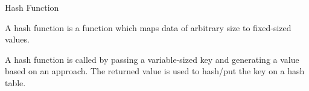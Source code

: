\begin{frame}{Hash Function}
    \begin{definition}
        A hash function is a function which maps data of arbitrary size to fixed-sized values.
    \end{definition}

    \begin{block}{}
        A hash function is called by passing a variable-sized key and generating a value based on an approach. The returned value is used to hash/put the key on a hash table.
    \end{block}
\end{frame}

